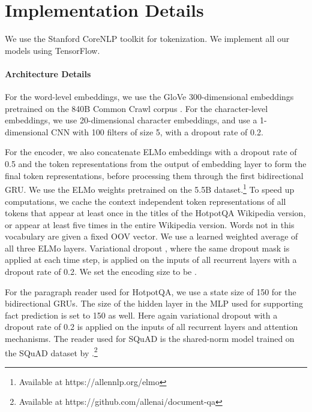 \documentclass[11pt,a4paper,dvipsnames]{article}
\begin{document}
\section{Implementation Details}
\label{sec:implementation}
We use the Stanford CoreNLP toolkit \citep{ManningSBFBM14corenlp} for tokenization.
We implement all our models using TensorFlow. 
\paragraph{Architecture Details}
For the word-level embeddings, we use the GloVe 300-dimensional embeddings pretrained on the 840B Common Crawl corpus \citep{PenningtonSM14glove}. For the character-level embeddings, we use 20-dimensional character embeddings, and use a 1-dimensional CNN with 100 filters of size 5, with a dropout \citep{SrivastavaHKSS14dropout} rate of 0.2. \par
For the encoder, we also concatenate ELMo \citep{Peters2018elmo} embeddings with a dropout rate of 0.5 and the token representations from the output of embedding layer to form the final token representations, before processing them through the first bidirectional GRU. We use the ELMo weights pretrained on the 5.5B dataset.\footnote{Available at https://allennlp.org/elmo} To speed up computations, we cache the context independent token representations of all tokens that appear at least once in the titles of the HotpotQA Wikipedia version, or appear at least five times in the entire Wikipedia version. Words not in this vocabulary are given a fixed OOV vector. We use a learned weighted average of all three ELMo layers. Variational dropout \citep{variationalDropout}, where the same dropout mask is applied at each time step, is applied on the inputs of all recurrent layers with a dropout rate of 0.2.
We set the encoding size to be . \par
For the paragraph reader used for HotpotQA, we use a state size of 150 for the bidirectional GRUs. The size of the hidden layer in the MLP used for supporting fact prediction is set to 150 as well. Here again variational dropout with a dropout rate of 0.2 is applied on the inputs of all recurrent layers and attention mechanisms. The reader used for SQuAD is the shared-norm model trained on the SQuAD dataset by \citet{GardnerC18snorm}.\footnote{Available at https://github.com/allenai/document-qa}
\end{document}

